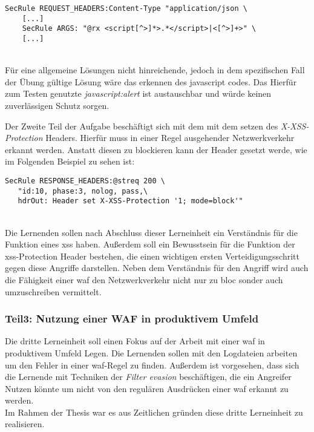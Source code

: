 \begin{lstlisting}
SecRule REQUEST_HEADERS:Content-Type "application/json \
    [...]
    SecRule ARGS: "@rx <script[^>]*>.*</script>|<[^>]+>" \
    [...]
\end{lstlisting}\ \\

Für eine allgemeine Lösungen nicht hinreichende, jedoch in dem spezifischen Fall der Übung gültige Lösung wäre das erkennen des javascript codes.
Das Hierfür zum Testen genutzte \textit{javascript:alert} ist austauschbar und würde keinen zuverlässigen Schutz sorgen.

Der Zweite Teil der Aufgabe beschäftigt sich mit dem mit dem setzen des \textit{X-XSS-Protection} Headers.
Hierfür muss in einer Regel ausgehender Netzwerkverkehr erkannt werden.
Anstatt diesen zu blockieren kann der Header gesetzt werde, wie im Folgenden Beispiel zu sehen ist:\\

\begin{lstlisting}
SecRule RESPONSE_HEADERS:@streq 200 \
   "id:10, phase:3, nolog, pass,\
   hdrOut: Header set X-XSS-Protection '1; mode=block'"
\end{lstlisting}\ \\

Die Lernenden sollen nach Abschluss dieser Lerneinheit ein Verständnis für die Funktion eines \ac{xss} haben.
Außerdem soll ein Bewusstsein für die Funktion der \ac{xss}-Protection Header bestehen, die einen wichtigen ersten Verteidigungsschritt gegen diese Angriffe darstellen.
Neben dem Verständnis für den Angriff wird auch die Fähigkeit einer \ac{waf} den Netzwerkverkehr nicht nur zu bloc sonder auch umzuschreiben vermittelt.

\subsubsection{Teil3: Nutzung einer WAF in produktivem Umfeld}
\label{sec:learning-unit-3-meta}

Die dritte Lerneinheit soll einen Fokus auf der Arbeit mit einer \ac{waf} in produktivem Umfeld Legen.
Die Lernenden sollen mit den Logdateien arbeiten um den Fehler in einer \ac{waf}-Regel zu finden.
Außerdem ist vorgesehen, dass sich die Lernende mit Techniken der \textit{Filter evasion} beschäftigen, die ein Angreifer Nutzen könnte um nicht von den regulären Ausdrücken einer \ac{waf} erkannt zu werden.\\

Im Rahmen der Thesis war es aus Zeitlichen gründen diese dritte Lerneinheit zu realisieren.
